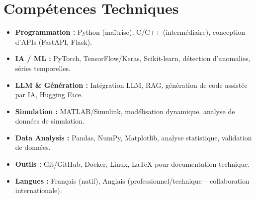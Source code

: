 \documentclass[a4paper,11pt]{article}
\begin{document}
\section{Compétences Techniques}
\begin{itemize}[leftmargin=*, nosep]
    \item \small{\textbf{Programmation :} Python (maîtrise), C/C++ (intermédiaire), conception d'APIs (FastAPI, Flask).}
    \item \small{\textbf{IA / ML :} PyTorch, TensorFlow/Keras, Scikit-learn, détection d'anomalies, séries temporelles.}
    \item \small{\textbf{LLM \& Génération :} Intégration LLM, RAG, génération de code assistée par IA, Hugging Face.}
    \item \small{\textbf{Simulation :} MATLAB/Simulink, modélisation dynamique, analyse de données de simulation.}
    \item \small{\textbf{Data Analysis :} Pandas, NumPy, Matplotlib, analyse statistique, validation de données.}
    \item \small{\textbf{Outils :} Git/GitHub, Docker, Linux, LaTeX pour documentation technique.}
    \item \small{\textbf{Langues :} Français (natif), Anglais (professionnel/technique -- collaboration internationale).}
\end{itemize}

\end{document}
